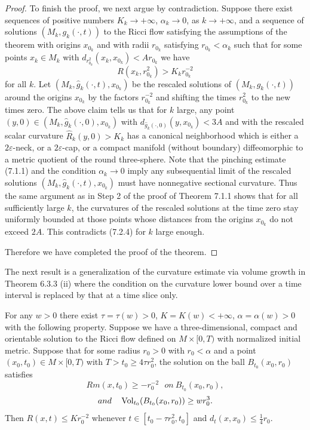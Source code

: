 \begin{proof}
To finish the proof, we next argue by contradiction. Suppose there
exist sequences of positive numbers $K_k\rightarrow+\infty$,
$\alpha_k\rightarrow0$, as $k\rightarrow+\infty$, and a sequence
of solutions $(M_k,g_k(\cdot,t))$ to the Ricci flow satisfying the
assumptions of the theorem with origins $x_{0_k}$ and with radii
$r_{0_k}$ satisfying $r_{0_k}<\alpha_k$ such that for some points
$x_k\in M_k$ with $d_{r^2_{0_k}}(x_k,x_{0_k})<Ar_{0_k}$ we have
\begin{equation}
R(x_k,r^2_{0_k})>K_kr^{-2}_{0_k} %
\end{equation} for all $k$. Let $(M_k,\hat{g}_k(\cdot,t),x_{0_k})$ be the
rescaled solutions of $(M_k,g_k(\cdot,t))$ around the origins
$x_{0_k}$ by the factors $r^{-2}_{0_k}$ and shifting the times
$r^2_{0_k}$ to the new times zero. The above claim tells us that
for $k$ large, any point $(y,0) \in
(M_k,\hat{g}_k(\cdot,0),x_{0_k})$ with
$d_{\hat{g}_k(\cdot,0)}(y,x_{0_k}) < 3A$ and with the rescaled
scalar curvature $\hat{R}_k(y,0) > K_k$ has a canonical
neighborhood which is either a $2\varepsilon$-neck, or a
$2\varepsilon$-cap, or a compact manifold (without boundary)
diffeomorphic to a metric quotient of the round three-sphere. Note
that the pinching estimate (7.1.1) and the condition
$\alpha_k\rightarrow0$ imply any subsequential limit of the
rescaled solutions $(M_k,\hat{g}_k(\cdot,t),x_{0_k})$ must have
nonnegative sectional curvature. Thus the same argument as in Step
2 of the proof of Theorem 7.1.1 shows that for all sufficiently
large $k$, the curvatures of the rescaled solutions at the time
zero stay uniformly bounded at those points whose distances from
the origins $x_{0_k}$ do not exceed $2A$. This contradicts (7.2.4)
for $k$ large enough.

Therefore we have completed the proof of the theorem.
\end{proof}

The next result is a generalization of the curvature estimate via
volume growth in Theorem 6.3.3 (ii) where the condition on the
curvature lower bound over a time interval is replaced by that at
a time slice only.

\begin{theorem}
  \label{thm:cz-lower-volume-ratio-curvature-control}

For any $w>0$ there exist $\tau=\tau(w)>0$, $K=K(w)<+\infty$,
$\alpha=\alpha(w)>0$ with the following property. Suppose we have
a three-dimensional, compact and orientable solution to the Ricci
flow defined on $M\times[0,T)$ with normalized initial metric.
Suppose that for some radius $r_0>0$ with $r_0<\alpha$ and a point
$(x_0,t_0)\in M\times[0,T)$ with $T
> t_0\geq4\tau r^2_0$, the solution on the ball $B_{t_0}(x_0,r_0)$
satisfies
$$
Rm(x,t_0)\geq-r_0^{-2}\ \ \ on\ B_{t_0}(x_0,r_0),
$$
$$
and\ \ \ \operatorname{Vol}_{t_0}(B_{t_0}(x_0,r_0))\geq wr_0^3.
$$
Then $R(x,t)\leq Kr_0^{-2}$ whenever $t\in[t_0-\tau r^2_0,t_0]$
and $d_t(x,x_0)\leq\frac{1}{4}r_0.$
\end{theorem}

